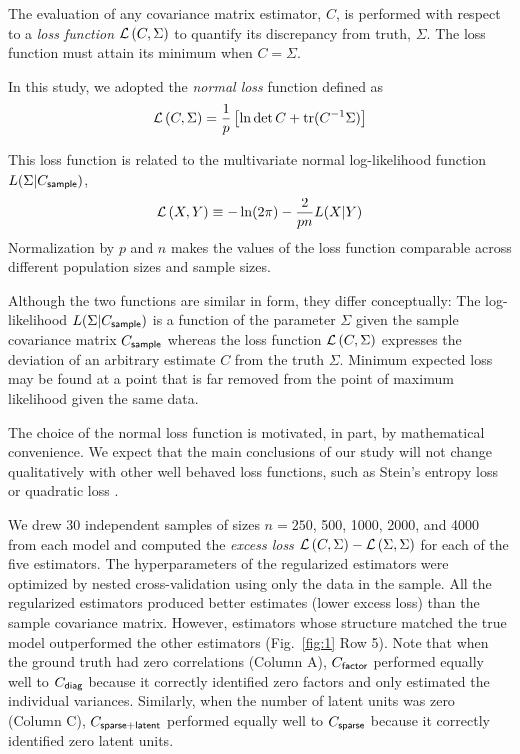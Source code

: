 The evaluation of any covariance matrix estimator, $C$, is performed with respect to a \emph{loss function} $\mathcal L\left(C,\Sigma\right)$ to quantify its discrepancy from truth, $\Sigma$.  The loss function must attain its minimum when $C=\Sigma$.

In this study, we adopted the \emph{normal loss} function defined as
\begin{equation}\label{eq:loss}
    \mathcal L\left(C,\Sigma\right) = \frac 1 p\left[\ln \det C + \operatorname{tr}(C^{-1}\Sigma)\right]
\end{equation}

This loss function is related to the multivariate normal log-likelihood function $L(\Sigma|C_{\sf sample})$,
\begin{equation}
    \mathcal L\left(X,Y\right) \equiv -\ln(2\pi) - \frac 2 {pn} L(X|Y)
\end{equation}
Normalization by $p$ and $n$ makes the values of the loss function comparable across different population sizes and sample sizes.

Although the two functions are similar in form, they differ conceptually: The log-likelihood $L(\Sigma|C_{\sf sample})$ is a function of the parameter $\Sigma$ given the sample covariance matrix $C_{\sf sample}$ whereas the loss function $\mathcal L\left(C,\Sigma\right)$ expresses the deviation of an arbitrary estimate $C$ from the truth $\Sigma$. Minimum expected loss may be found at a point that is far removed from the point of maximum likelihood given the same data.

The choice of the normal loss function is motivated, in part, by mathematical convenience. We expect that the main conclusions of our study will not change qualitatively with other well behaved loss functions, such as Stein's entropy loss or quadratic loss \cite{James:1961, Fan:2008, Ledoit:2004, Schafer:2005}.

We drew 30 independent samples of sizes $n=250$, 500, 1000, 2000, and 4000 from each model and computed the \emph{excess loss} $\mathcal L\left(C,\Sigma\right)-\mathcal L\left(\Sigma,\Sigma\right)$ for each of the five estimators.  The hyperparameters of the regularized estimators were optimized by nested cross-validation using only the data in the sample.  All the regularized estimators produced better estimates (lower excess loss) than the sample covariance matrix.  However, estimators whose structure matched the true model outperformed the other estimators (Fig.~\ref{fig:1} Row 5).  Note that when the ground truth had zero correlations (Column A), $C_{\sf factor}$ performed equally well to $C_{\sf diag}$ because it correctly identified zero factors and only estimated the individual variances. Similarly, when the number of latent units was zero (Column C), $C_{\sf sparse+latent}$ performed equally well to $C_{\sf sparse}$ because it correctly identified zero latent units.

